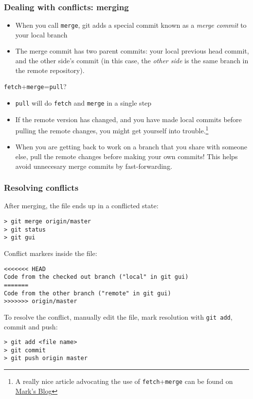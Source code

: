 \begin{frame}[fragile]
	\frametitle{Dealing with conflicts: merging}
	\begin{itemize}
	\item When you call \texttt{merge}, git adds a special commit known as a \textit{merge commit} to your local branch
	\item The merge commit has two parent commits: your local previous head commit, and the other side's commit (in this case, the \textit{other side} is the same branch in the remote repository).
	\end{itemize}
	\begin{block}{\texttt{fetch}+\texttt{merge}=\texttt{pull}?}
	\begin{itemize}	
	\small
	\item \texttt{pull} will do \texttt{fetch} and \texttt{merge} in a single step
	\item If the remote version has changed, and you have made local commits before pulling the remote changes, you might get yourself into trouble.\footnote{A really nice article advocating the use of \texttt{fetch}+\texttt{merge} can be found on \href{http://longair.net/blog/2009/04/16/git-fetch-and-merge/}{Mark's Blog}} 
	\item When you are getting back to work on a branch that you share with someone else, pull the remote changes before making your own commits! This helps avoid unnecesary merge commits by fast-forwarding.
	\end{itemize}
	\end{block}
\end{frame}

\begin{frame}[fragile]
	\frametitle{Resolving conflicts}
	
	After merging, the file ends up in a conflicted state:
	\begin{verbatim}
> git merge origin/master
> git status
> git gui
	\end{verbatim}	
	
	Conflict markers inside the file:
	\begin{verbatim}
<<<<<<< HEAD
Code from the checked out branch ("local" in git gui) 
=======
Code from the other branch ("remote" in git gui)
>>>>>>> origin/master
	\end{verbatim}

	To resolve the conflict, manually edit the file, mark resolution with \texttt{git add}, commit and push:
	\begin{verbatim}
> git add <file name>
> git commit
> git push origin master
	\end{verbatim}
	
\end{frame}


